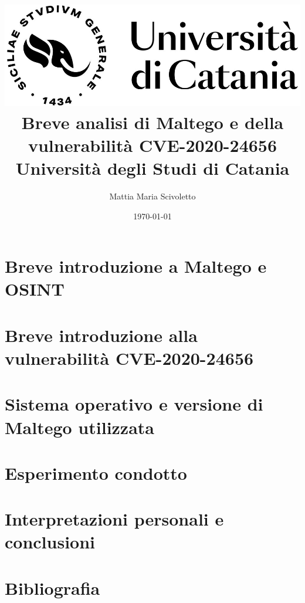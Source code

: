 \documentclass[12pt]{report}
\title{
    {\includegraphics[scale=0.4]{UniCT-Logo.jpg}}\\
    {Breve analisi di Maltego e della vulnerabilità CVE-2020-24656}\\
    {\large Università degli Studi di Catania}
}
\author{Mattia Maria Scivoletto}
\date{\today}
\begin{document}
\maketitle


\tableofcontents

\chapter{Breve introduzione a Maltego e OSINT}


\chapter{Breve introduzione alla vulnerabilità CVE-2020-24656}


\chapter{Sistema operativo e versione di Maltego utilizzata}


\chapter{Esperimento condotto}


\chapter{Interpretazioni personali e conclusioni}


%

\chapter{Bibliografia}

\end{document}
